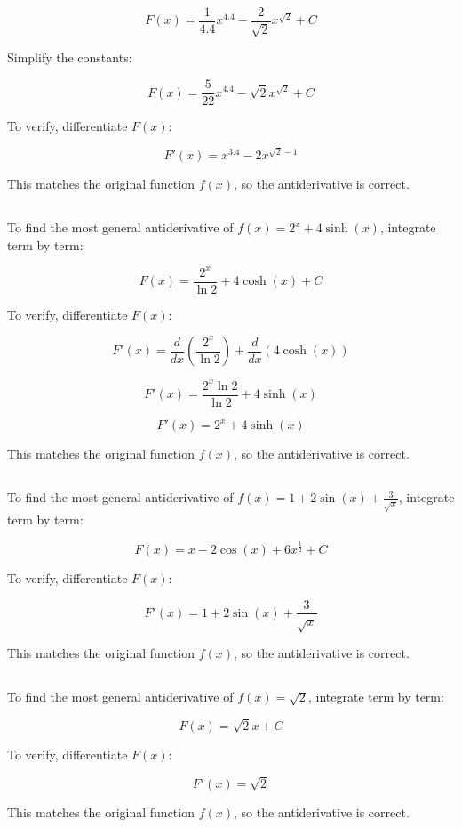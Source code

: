 \documentclass{article}
\begin{document}
\[
F(x) = \frac{1}{4.4}x^{4.4} - \frac{2}{\sqrt{2}}x^{\sqrt{2}} + C
\]

Simplify the constants:

\[
F(x) = \frac{5}{22}x^{4.4} - \sqrt{2}x^{\sqrt{2}} + C
\]

To verify, differentiate \( F(x) \):

\[
F'(x) = x^{3.4} - 2x^{\sqrt{2} - 1}
\]

This matches the original function \( f(x) \), so the antiderivative is correct.
\subsection{}
To find the most general antiderivative of \( f(x) = 2^x + 4\sinh(x) \), integrate term by term:

\[
F(x) = \frac{2^x}{\ln 2} + 4\cosh(x) + C
\]

To verify, differentiate \( F(x) \):

\[
F'(x) = \frac{d}{dx} \left( \frac{2^x}{\ln 2} \right) + \frac{d}{dx} (4\cosh(x))
\]

\[
F'(x) = \frac{2^x \ln 2}{\ln 2} + 4\sinh(x)
\]

\[
F'(x) = 2^x + 4\sinh(x)
\]

This matches the original function \( f(x) \), so the antiderivative is correct.
\subsection{}
To find the most general antiderivative of \( f(x) = 1 + 2\sin(x) + \frac{3}{\sqrt{x}} \), integrate term by term:

\[
F(x) = x - 2\cos(x) + 6x^{\frac{1}{2}} + C
\]

To verify, differentiate \( F(x) \):

\[
F'(x) = 1 + 2\sin(x) + \frac{3}{\sqrt{x}}
\]

This matches the original function \( f(x) \), so the antiderivative is correct.
\subsection{}
To find the most general antiderivative of \( f(x) = \sqrt{2} \), integrate term by term:

\[
F(x) = \sqrt{2}x + C
\]

To verify, differentiate \( F(x) \):

\[
F'(x) = \sqrt{2}
\]

This matches the original function \( f(x) \), so the antiderivative is correct.
\end{document}
